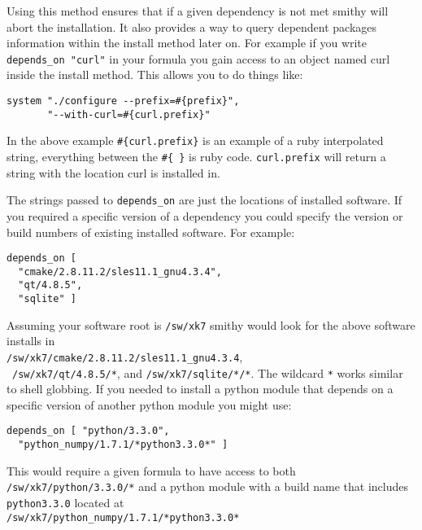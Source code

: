 \documentclass{acm_proc_article-sp}
\begin{document}
Using this method ensures that if a given dependency is not met smithy will
abort the installation. It also provides a way to query dependent packages
information within the install method later on. For example if you write
\texttt{depends\_on "curl"} in your formula you gain access to an object named curl
inside the install method. This allows you to do things like:

\begin{quoting}
\begin{verbatim}
system "./configure --prefix=#{prefix}",
       "--with-curl=#{curl.prefix}"
\end{verbatim}
\end{quoting}

In the above example \texttt{\#\{curl.prefix\}} is an example of a ruby
interpolated string, everything between the \texttt{\#\{ \}} is ruby code.
\texttt{curl.prefix} will return a string with the location curl is installed
in.

The strings passed to \texttt{depends\_on} are just the locations of installed
software.  If you required a specific version of a dependency you could
specify the version or build numbers of existing installed software. For
example:

\begin{quoting}
\begin{verbatim}
depends_on [
  "cmake/2.8.11.2/sles11.1_gnu4.3.4",
  "qt/4.8.5",
  "sqlite" ]
\end{verbatim}
\end{quoting}

Assuming your software root is \texttt{/sw/xk7} smithy would look for the above
software installs in \\
\texttt{/sw/xk7/cmake/2.8.11.2/sles11.1\_gnu4.3.4}, \\
~\texttt{/sw/xk7/qt/4.8.5/*}, and \texttt{/sw/xk7/sqlite/*/*}. The wildcard
\texttt{*} works similar to shell globbing. If you needed to install a python
module that depends on a specific version of another python module you might
use:

\begin{quoting}
\begin{verbatim}
depends_on [ "python/3.3.0",
  "python_numpy/1.7.1/*python3.3.0*" ]
\end{verbatim}
\end{quoting}

This would require a given formula to have access to both
\texttt{/sw/xk7/python/3.3.0/*} and a python module with a build name that includes
\texttt{python3.3.0} located at \\
\texttt{/sw/xk7/python\_numpy/1.7.1/*python3.3.0*}
\end{document}
